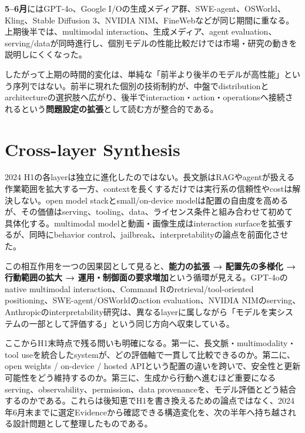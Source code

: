 \textbf{5--6月}にはGPT-4o、Google I/Oの生成メディア群、SWE-agent、OSWorld、Kling、Stable Diffusion 3、NVIDIA NIM、FineWebなどが同じ期間に重なる\autocite{src-2d3a533e91db,src-0f33134a9129,src-1c9f1d22c176,src-70b5d4b3bedd,src-9c32b95d27a7,src-36cdd427b766,src-054d1f81750b,src-51631a225b70}。上期後半では、multimodal interaction、生成メディア、agent evaluation、serving/dataが同時進行し、個別モデルの性能比較だけでは市場・研究の動きを説明しにくくなった。

したがって上期の時間的変化は、単純な「前半より後半のモデルが高性能」という序列ではない。前半に現れた個別の技術制約が、中盤でdistributionとarchitectureの選択肢へ広がり、後半でinteraction・action・operationsへ接続されるという\textbf{問題設定の拡張}として読む方が整合的である。

\section{Cross-layer Synthesis}
2024 H1の各layerは独立に進化したのではない。長文脈はRAGやagentが扱える作業範囲を拡大する一方、contextを長くするだけでは実行系の信頼性やcostは解決しない。open model stackとsmall/on-device modelは配置の自由度を高めるが、その価値はserving、tooling、data、ライセンス条件と組み合わせて初めて具体化する。multimodal modelと動画・画像生成はinteraction surfaceを拡張するが、同時にbehavior control、jailbreak、interpretabilityの論点を前面化させた。

この相互作用を一つの因果図として見ると、\textbf{能力の拡張 → 配置先の多様化 → 行動範囲の拡大 → 運用・制御面の要求増加}という循環が見える。GPT-4oのnative multimodal interaction、Command Rのretrieval/tool-oriented positioning、SWE-agent/OSWorldのaction evaluation、NVIDIA NIMのserving、Anthropicのinterpretability研究は、異なるlayerに属しながら「モデルを実システムの一部として評価する」という同じ方向へ収束している\autocite{src-2d3a533e91db,src-77e35e5f22be,src-1c9f1d22c176,src-70b5d4b3bedd,src-054d1f81750b,src-4ff5ab7d45bc}。

ここからH1末時点で残る問いも明確になる。第一に、長文脈・multimodality・tool useを統合したsystemが、どの評価軸で一貫して比較できるのか。第二に、open weights / on-device / hosted APIという配置の違いを跨いで、安全性と更新可能性をどう維持するのか。第三に、生成から行動へ進むほど重要になるserving、observability、permission、data provenanceを、モデル評価とどう結合するのかである。これらは後知恵でH1を書き換えるための論点ではなく、2024年6月末までに選定Evidenceから確認できる構造変化を、次の半年へ持ち越される設計問題として整理したものである。
